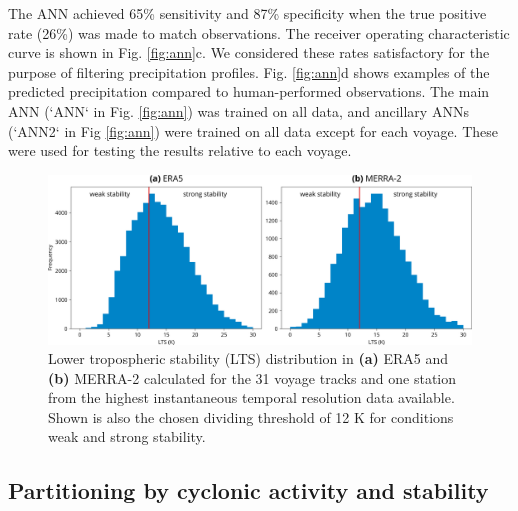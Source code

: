\documentclass[draft]{agujournal2019}
\begin{document}
The ANN achieved 65\% sensitivity and 87\% specificity when the true positive
rate (26\%) was made to match observations. The receiver operating
characteristic curve is shown in Fig. \ref{fig:ann}c. We considered these rates
satisfactory for the purpose of filtering precipitation profiles. Fig.
\ref{fig:ann}d shows examples of the predicted precipitation compared to
human-performed observations. The main ANN (`ANN` in Fig. \ref{fig:ann}) was
trained on all data, and ancillary ANNs (`ANN2` in Fig \ref{fig:ann}) were
trained on all data except for each voyage. These were used for testing the
results relative to each voyage.

\begin{figure}[b!]
\centering
\includegraphics[width=\textwidth]{img/lts_dist.pdf}
\caption{
Lower tropospheric stability (LTS) distribution in \textbf{(a)} ERA5 and
\textbf{(b)} MERRA-2 calculated for the 31 voyage tracks and one station from
the highest instantaneous temporal resolution data available. Shown is also the
chosen dividing threshold of 12 K for conditions weak and strong stability.
}
\label{fig:lts}
\end{figure}

\subsection{Partitioning by cyclonic activity and stability}
\label{sec:cyclone-stability}
\end{document}
